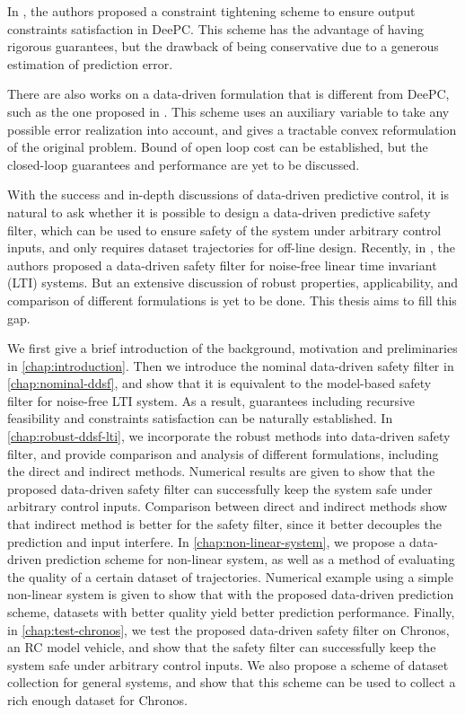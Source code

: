 In \cite{berberich_data-driven-robust_2021}, the authors proposed a constraint tightening scheme to ensure output constraints satisfaction in DeePC.
This scheme has the advantage of having rigorous guarantees, but the drawback of being conservative due to a generous estimation of prediction error.

There are also works on a data-driven formulation that is different from DeePC, such as the one proposed in \cite{huang_robust_2023}.
This scheme uses an auxiliary variable to take any possible error realization into account, and gives a tractable convex reformulation of the original problem.
Bound of open loop cost can be established, but the closed-loop guarantees  and performance are yet to be discussed.

With the success and in-depth discussions of data-driven predictive control, it is natural to ask whether it is possible to design a data-driven predictive safety filter, which can be used to ensure safety of the system under arbitrary control inputs, and only requires dataset trajectories for off-line design.
Recently, in \cite{bajelani_data-driven_2023}, the authors proposed a data-driven safety filter for noise-free linear time invariant (LTI) systems.
But an extensive discussion of robust properties, applicability, and comparison of different formulations is yet to be done.
This thesis aims to fill this gap.

We first give a brief introduction of the background, motivation and preliminaries in \cref{chap:introduction}.
Then we introduce the nominal data-driven safety filter in \cref{chap:nominal-ddsf}, and show that it is equivalent to the model-based safety filter for noise-free LTI system.
As a result, guarantees including recursive feasibility and constraints satisfaction can be naturally established.
In \cref{chap:robust-ddsf-lti}, we incorporate the robust methods into data-driven safety filter, and provide comparison and analysis of different formulations, including the direct and indirect methods.
Numerical results are given to show that the proposed data-driven safety filter can successfully keep the system safe under arbitrary control inputs.
Comparison between direct and indirect methods show that indirect method is better for the safety filter, since it better decouples the prediction and input interfere.
In \cref{chap:non-linear-system}, we propose a data-driven prediction scheme for non-linear system, as well as a method of evaluating the quality of a certain dataset of trajectories.
Numerical example using a simple non-linear system is given to show that with the proposed data-driven prediction scheme, datasets with better quality yield better prediction performance.
Finally, in \cref{chap:test-chronos}, we test the proposed data-driven safety filter on Chronos, an RC model vehicle, and show that the safety filter can successfully keep the system safe under arbitrary control inputs.
We also propose a scheme of dataset collection for general systems, and show that this scheme can be used to collect a rich enough dataset for Chronos.


